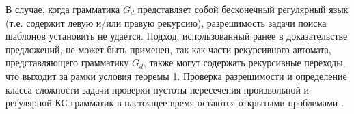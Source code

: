 В случае, когда грамматика $G_d$ представляет собой бесконечный регулярный язык (т.е. содержит левую и/или правую рекурсию), разрешимость задачи поиска шаблонов установить не удается. Подход, использованный ранее в доказательстве предложений, не может быть применен, так как части рекурсивного автомата, представляющего грамматику $G_d$, также могут содержать рекурсивные переходы, что выходит за рамки условия теоремы 1. Проверка разрешимости и определение класса сложности задачи проверки пустоты пересечения произвольной и регулярной КС-грамматик в настоящее время остаются открытыми проблемами \cite{Nederhof}.

%


